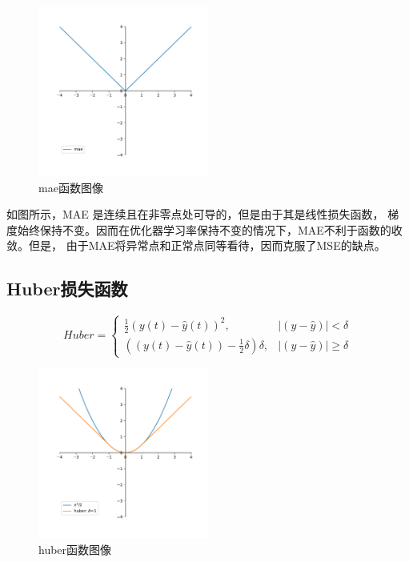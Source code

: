 \documentclass[AutoFakeBold]{LZUThesis}
\begin{document}
\begin{figure}[H]
	\centering
    \includegraphics[width=0.5\textwidth]{figures/mae.pdf}
    \caption{mae函数图像}
    \label{fig_mse}
\end{figure}

如图\label{fig_mae}所示，MAE 是连续且在非零点处可导的，但是由于其是线性损失函数，
梯度始终保持不变。因而在优化器学习率保持不变的情况下，MAE不利于函数的收敛。但是，
由于MAE将异常点和正常点同等看待，因而克服了MSE的缺点。

\subsection{Huber损失函数}
$$
Huber=
\left\{\begin{matrix}
    \frac{1}{2}(y\left(t\right) - \hat{y}\left(t\right))^{2}, & \left | (y - \hat{y})  \right | < \delta\\
    ((y\left(t\right) - \hat{y}\left(t\right)) - \frac1 2 \delta)\delta, & \left | (y - \hat{y})  \right | \geq \delta
\end{matrix}\right.
$$

\begin{figure}[H]
	\centering
    \includegraphics[width=0.5\textwidth]{figures/huber.pdf}
    \caption{huber函数图像}
    \label{fig_huber}
\end{figure}
\end{document}
